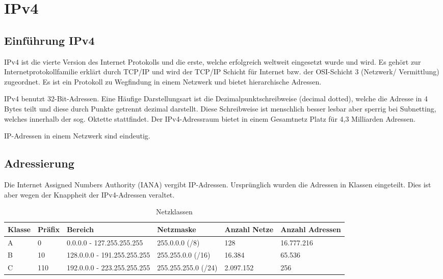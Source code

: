 \section{IPv4}

\subsection{Einführung IPv4}

IPv4 ist die vierte Version des Internet Protokolls und die erste, welche erfolgreich weltweit eingesetzt wurde und wird. Es gehört zur Internetprotokollfamilie erklärt durch TCP/IP und wird der TCP/IP Schicht für Internet bzw. der OSI-Schicht 3 (Netzwerk/ Vermittlung) zugeordnet. Es ist ein Protokoll zu Wegfindung in einem Netzwerk und bietet hierarchische Adressen.

IPv4 benutzt 32-Bit-Adressen. Eine Häufige Darstellungsart ist die Dezimalpunktschreibweise (decimal dotted), welche die Adresse in 4 Bytes teilt und diese durch Punkte getrennt dezimal darstellt. Diese Schreibweise ist menschlich besser lesbar aber sperrig bei Subnetting, welches innerhalb der sog. Oktette stattfindet. Der IPv4-Adressraum bietet in einem Gesamtnetz Platz für 4,3 Milliarden Adressen.

IP-Adressen in einem Netzwerk sind eindeutig.

\subsection{Adressierung}

Die Internet Assigned Numbers Authority (IANA) vergibt IP-Adressen. Ursprünglich wurden die Adressen in Klassen eingeteilt. Dies ist aber wegen der Knappheit der IPv4-Adressen veraltet.

\begin{table}
    [H]
    \centering
    \begin{tabulary}{\textwidth}{|l|l|L|L|l|l|}
        \hline
        \textbf{Klasse} & \textbf{Präfix} & \textbf{Bereich}            & \textbf{Netzmaske}  & \textbf{Anzahl Netze} & \textbf{Anzahl Adressen} \\\hline
        A               & 0               & 0.0.0.0 - 127.255.255.255   & 255.0.0.0 (/8)      & 128                   & 16.777.216               \\\hline
        B               & 10              & 128.0.0.0 - 191.255.255.255 & 255.255.0.0 (/16)   & 16.384                & 65.536                   \\\hline
        C               & 110             & 192.0.0.0 - 223.255.255.255 & 255.255.255.0 (/24) & 2.097.152             & 256                      \\\hline
    \end{tabulary}
    \caption{Netzklassen}
\end{table}

